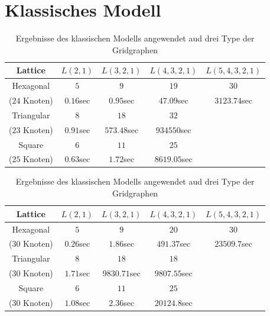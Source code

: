 \documentclass[
	fontsize=12pt,
	paper=a4,
	twoside=false,
	numbers=noenddot,
	plainheadsepline,
	toc=listof,
	toc=bibliography
]{scrartcl}
\begin{document}
\section{Klassisches Modell}
\begin{table}[htbp]
\centering
\begin{tabular}{|c|c|c|c|c|}
\hline 
	Lattice    & $L(2,1)$   & $L(3,2,1)$ & $L(4,3,2,1)$ & $L(5,4,3,2,1)$ \\ \hline 
	Hexagonal  & $5$        & $9$        & $19$         & $30$           \\ 
($24$ Knoten)  & $0.16$sec  & $0.95$sec  & $47.09$sec   & $3123.74$sec   \\ \hline
			   
	Triangular& $8$	        & $18$        &  $32$            &    \\ 
($23$ Knoten) & $0.91$sec   & $573.48$sec &  $934550$sec     &    \\ \hline
			  
	Square    &  $6$	    &  $11$       & $25$         &    \\ 
($25$ Knoten) & $0.63$sec   &  $1.72$sec  & $8619.05$sec & \\ \hline
\end{tabular}
\caption{ Ergebnisse des klassischen Modells angewendet aud drei Type der Gridgraphen} 
\label{Table:T0}
\end{table}

\begin{table}[htbp]
\centering
\begin{tabular}{|c|c|c|c|c|}
\hline 
	Lattice    & $L(2,1)$   & $L(3,2,1)$ & $L(4,3,2,1)$ & $L(5,4,3,2,1)$ \\ \hline 
	
	Hexagonal  & $5$        & $9$        & $20$          & $30$           \\ 
    ($30$ Knoten)  & $0.26$sec  & $1.86$sec  & $491.37$sec   & $23509.7$sec   \\ \hline
			   
	Triangular & $8$	 & $18$         & $18$        &    \\ 
    ($30$ Knoten)  & $1.71$sec  & $9830.71$sec & $9807.55$sec&    \\ \hline
			  
	Square    & $6$	         & $11$         & $25$             &    \\ 
    ($30$ Knoten) & $1.08$sec   & $2.36$sec    & $20124.8$sec     & \\ \hline

\end{tabular}
\caption{ Ergebnisse des klassischen Modells angewendet aud drei Type der Gridgraphen} 
\label{Table:T0}
\end{table}
\end{document}
